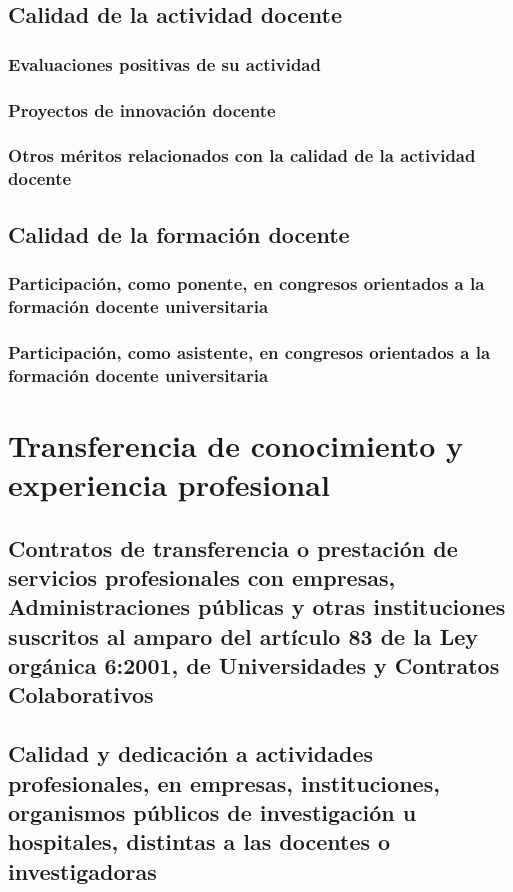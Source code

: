 \newpage\subsection{Calidad de la actividad docente}
\newpage\subsubsection{Evaluaciones positivas de su actividad}
\newpage\subsubsection{Proyectos de innovación docente}
\newpage\subsubsection{Otros méritos relacionados con la calidad de la actividad docente}
\newpage\subsection{Calidad de la formación docente}
\newpage\subsubsection{Participación, como ponente, en congresos orientados a la formación docente universitaria}
\newpage\subsubsection{Participación, como asistente, en congresos orientados a la formación docente universitaria}
\newpage\section{Transferencia de conocimiento y experiencia profesional}
\newpage\subsection{Contratos de transferencia o prestación de servicios profesionales con empresas, Administraciones públicas y otras instituciones suscritos al amparo del artículo 83 de la Ley orgánica 6:2001, de Universidades y Contratos Colaborativos}
\newpage\subsection{Calidad y dedicación a actividades profesionales, en empresas, instituciones, organismos públicos de investigación u hospitales, distintas a las docentes o investigadoras}
